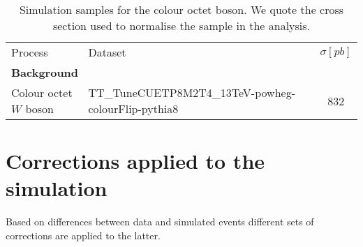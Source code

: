 \begin{table}[htb]
\begin{center}
\caption{Simulation samples for the colour octet \PW boson. We quote the cross section used to normalise the sample in the analysis.}
\label{tab:mcdatasets_flip}
\hspace*{-0.5cm}
\begin{tabular}{ llc }
\hline
Process & Dataset & $\sigma[pb]$\\
\multicolumn{3}{l}{\bf Background} \\
\hline
Colour octet $W$ boson &  {\small TT\_TuneCUETP8M2T4\_13TeV-powheg-colourFlip-pythia8} & 832 \\
\hline
\end{tabular}
\end{center}
\end{table}

\section{Corrections applied to the simulation}
\label{sec:mccorrections}

Based on differences between data and simulated events different sets of corrections are applied to the latter.

